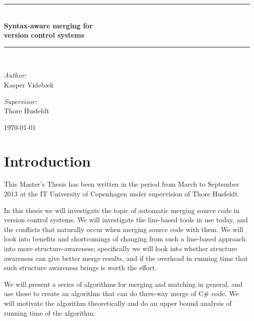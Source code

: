 \documentclass[11pt]{article}
\author{Kasper Videbæk}
\date{\today}
\newcommand{\HRule}{\rule{\linewidth}{0.5mm}}
\begin{document}
\begin{titlepage}
\begin{center}

\HRule \\[0.4cm]
{ \huge \bfseries Syntax-aware merging for \\ version control systems \\[0.4cm] }

\HRule \\[1.5cm]

\begin{minipage}{0.4\textwidth}
\begin{flushleft} \large
\emph{Author:}\\
Kasper Videbæk
\end{flushleft}
\end{minipage}
\begin{minipage}{0.4\textwidth}
\begin{flushright} \large
\emph{Supervisor:} \\
Thore Husfeldt
\end{flushright}
\end{minipage}

\vfill

{\large \today}

\end{center}
\end{titlepage}

\clearpage
\setcounter{tocdepth}{2}
\tableofcontents

\clearpage 
\section{Introduction}
This Master’s Thesis has been written in the period from March to September 2013 at the IT University of Copenhagen under supervision of Thore Husfeldt.

In this thesis we will investigate the topic of automatic merging source code in version control systems. We will investigate the line-based tools in use today, and the conflicts that naturally occur when merging source code with them. We will look into benefits and shortcomings of changing from such a line-based approach into more structure-awareness; specifically we will look into whether structure awareness can give better merge results, and if the overhead in running time that such structure awareness brings is worth the effort.

We will present a series of algorithms for merging and matching in general, and use these to create an algorithm that can do three-way merge of C\# code. We will motivate the algorithm theoretically and do an upper bound analysis of running time of the algorithm.
\end{document}
